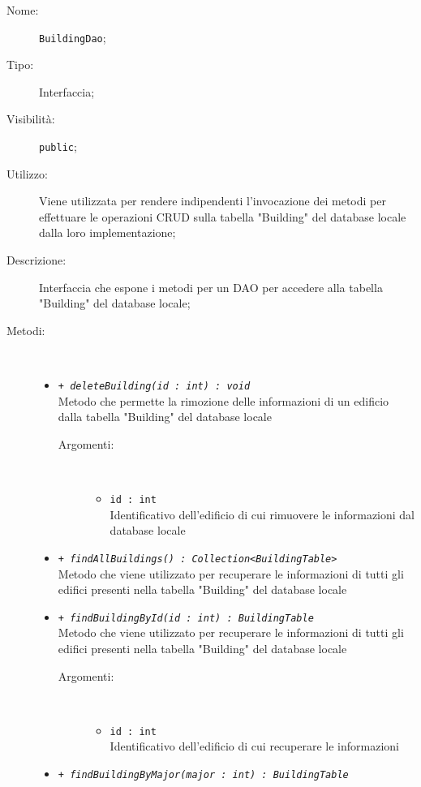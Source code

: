 \documentclass[../DefinizioneDiProdotto.tex]{subfiles}
\begin{document}
\begin{description}
	\item[Nome:] \texttt{BuildingDao};
	\item[Tipo:] Interfaccia;
	\item[Visibilità:] \texttt{public};
	\item[Utilizzo:] Viene utilizzata per rendere indipendenti l'invocazione dei metodi per effettuare le operazioni CRUD sulla tabella "Building" del database locale dalla loro implementazione;
	\item[Descrizione:] Interfaccia che espone i metodi per un DAO per accedere alla tabella "Building" del database locale;
	\item[Metodi:] \
	\begin{itemize}
		\item \texttt{+ \textit{deleteBuilding(id : int) : void}}\\
		Metodo che permette la rimozione delle informazioni di un edificio dalla tabella "Building" del database locale 
		\begin{description}
			\item[Argomenti:] \
			\begin{itemize}
				\item \texttt{id : int}\\
				Identificativo dell'edificio di cui rimuovere le informazioni dal database locale\end{itemize}
		\end{description}
		\item \texttt{+ \textit{findAllBuildings() : Collection<BuildingTable>}}\\
		Metodo che viene utilizzato per recuperare le informazioni di tutti gli edifici presenti nella tabella "Building" del database locale
		\item \texttt{+ \textit{findBuildingById(id : int) : BuildingTable}}\\
		Metodo che viene utilizzato per recuperare le informazioni di tutti gli edifici presenti nella tabella "Building" del database locale
		\begin{description}
			\item[Argomenti:] \
			\begin{itemize}
				\item \texttt{id : int}\\
				Identificativo dell'edificio di cui recuperare le informazioni\end{itemize}
		\end{description}
		\item \texttt{+ \textit{findBuildingByMajor(major : int) : BuildingTable}}\\

\end{itemize}
\end{description}
\end{document}
